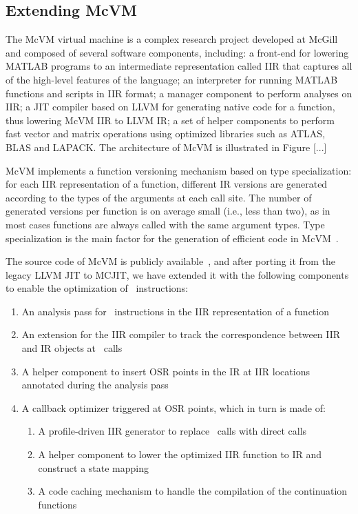 \subsection{Extending McVM}
The McVM virtual machine is a complex research project developed at McGill and composed of several software components, including: a front-end for lowering MATLAB programs to an intermediate representation called IIR that captures all of the high-level features of the language; an interpreter for running MATLAB functions and scripts in IIR format; a manager component to perform analyses on IIR; a JIT compiler based on LLVM for generating native code for a function, thus lowering McVM IIR to LLVM IR; a set of helper components to perform fast vector and matrix operations using optimized libraries such as ATLAS, BLAS and LAPACK. The architecture of McVM is illustrated in Figure [...]

McVM implements a function versioning mechanism based on type specialization: for each IIR representation of a function, different IR versions are generated according to the types of the arguments at each call site. The number of generated versions per function is on average small (i.e., less than two), as in most cases functions are always called with the same argument types. Type specialization is the main factor for the generation of efficient code in McVM~\cite{chevalier2010mcvm}.

The source code of McVM is publicly available~\cite{mcvm}, and after porting it from the legacy LLVM JIT to MCJIT, we have extended it with the following components to enable the optimization of \feval\ instructions:
\begin{enumerate}
\item An analysis pass for \feval\ instructions in the IIR representation of a function
\item An extension for the IIR compiler to track the correspondence between IIR and IR objects at \feval\ calls
\item A helper component to insert OSR points in the IR at IIR locations annotated during the analysis pass
\item A callback optimizer triggered at OSR points, which in turn is made of:
\begin{enumerate}
\item A profile-driven IIR generator to replace \feval\ calls with direct calls
\item A helper component to lower the optimized IIR function to IR and construct a state mapping 
\item A code caching mechanism to handle the compilation of the continuation functions
\end{enumerate}
\end{enumerate}

